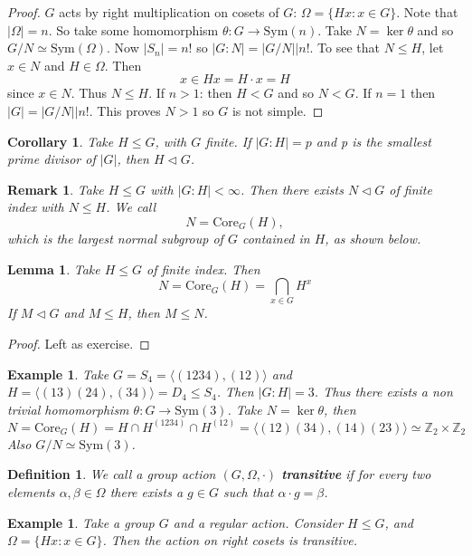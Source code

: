 \documentclass[a4paper,10pt]{article}
\newcommand{\ZZ}{\mathbb{Z}}
\newtheorem{Def}[thm]{Definition}
\newtheorem{Cor}[thm]{Corollary}
\newtheorem{eg}[thm]{Example}
\newtheorem{Lem}[thm]{Lemma}
\newtheorem{rem}[thm]{Remark}
\begin{document}
\begin{proof}
$G$ acts by right multiplication on cosets of $G$: $\Omega = \{ Hx : x \in G \}$. Note that $|\Omega| = n$. So take some homomorphism $\theta : G \rightarrow \text{Sym}(n)$. Take $N = \ker \theta$ and so $G / N \simeq \text{Sym}(\Omega)$. Now $|S_n| = n!$ so  $|G : N| = |G / N| \big| n!$. To see that $N \leq H$, let $x \in N$ and $H \in \Omega$. Then 
\[ x \in Hx = H \cdot x = H \]
since $x \in N$. Thus $N \leq H$. If $n > 1$: then $H < G$ and so $N < G$. If $n = 1$ then $|G| = |G / N| \big| n!$. This proves $N > 1$ so $G$ is not simple.
\end{proof}

\begin{Cor}
Take $H \leq G$, with $G$ finite. If $|G:H| = p$ and p is the smallest prime divisor of $|G|$, then $H \triangleleft G$.
\end{Cor}

\begin{rem}
Take $H \leq G$ with $|G:H| < \infty$. Then there exists $N \triangleleft G$ of finite index with $N \leq H$. We call
\[ N = \text{Core}_G(H), \]
which is the largest normal subgroup of $G$ contained in $H$, as shown below. 
\end{rem}

\begin{Lem}
Take $H \leq G$ of finite index. Then
\[ N = \text{Core}_G(H) = \bigcap_{x \in G} H^x \]
If $M \triangleleft G$ and $M \leq H$, then $M \leq N$.
\end{Lem}
\begin{proof}
Left as exercise.
\end{proof}

\begin{eg}
Take $G = S_4 = \langle (1234), (12) \rangle$ and $H = \langle (13)(24), (34) \rangle = D_4 \leq S_4$. Then $|G:H| = 3$. Thus there exists a non trivial homomorphism $\theta : G \rightarrow \text{Sym} (3)$. Take $N = \ker \theta$, then 
\[ N = \text{Core}_G(H) = H \cap H^{(1234)} \cap H^{(12)} = \langle (12)(34), (14)(23) \rangle \simeq \ZZ_2 \times \ZZ_2 \]
Also $G / N \simeq \text{Sym}(3)$.
\end{eg}


\begin{Def}
We call a group action $(G, \Omega, \cdot)$ \textbf{transitive} if for every two elements $\alpha, \beta \in \Omega$ there exists a $g \in G$ such that $\alpha \cdot g = \beta$. 
\end{Def}


\begin{eg}
Take a group $G$ and a regular action. Consider $H \leq G$, and $\Omega = \{ Hx : x \in G \}$. Then the action on right cosets is transitive. 
\end{eg}
\end{document}
